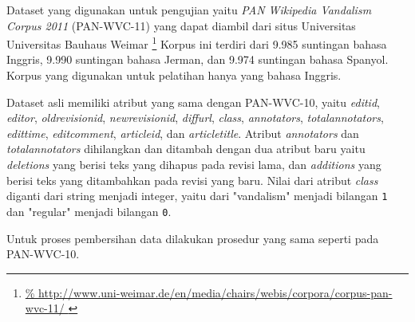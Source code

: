 Dataset yang digunakan untuk pengujian yaitu \textit{PAN Wikipedia Vandalism
Corpus 2011} (PAN-WVC-11)
\cite{potthast:2010b}
yang dapat diambil dari situs Universitas Universitas Bauhaus Weimar
\footnote{%
	\RaggedRight\url{%
http://www.uni-weimar.de/en/media/chairs/webis/corpora/corpus-pan-wvc-11/
	}
}
Korpus ini terdiri dari 9.985 suntingan bahasa Inggris, 9.990 suntingan bahasa
Jerman, dan 9.974 suntingan bahasa Spanyol.
Korpus yang digunakan untuk pelatihan hanya yang bahasa Inggris.

Dataset asli memiliki atribut yang sama dengan PAN-WVC-10, yaitu
\textit{editid},
\textit{editor},
\textit{oldrevisionid},
\textit{newrevisionid},
\textit{diffurl},
\textit{class},
\textit{annotators},
\textit{totalannotators},
\textit{edittime},
\textit{editcomment},
\textit{articleid}, dan
\textit{articletitle}.
Atribut \textit{annotators} dan \textit{totalannotators} dihilangkan dan
ditambah dengan dua atribut baru yaitu \textit{deletions} yang berisi teks yang
dihapus pada revisi lama, dan \textit{additions} yang berisi teks yang
ditambahkan pada revisi yang baru.
Nilai dari atribut \textit{class} diganti dari string menjadi integer, yaitu
dari "vandalism" menjadi bilangan \texttt{1}
dan "regular" menjadi bilangan \texttt{0}.

Untuk proses pembersihan data dilakukan prosedur yang sama seperti pada
PAN-WVC-10.
